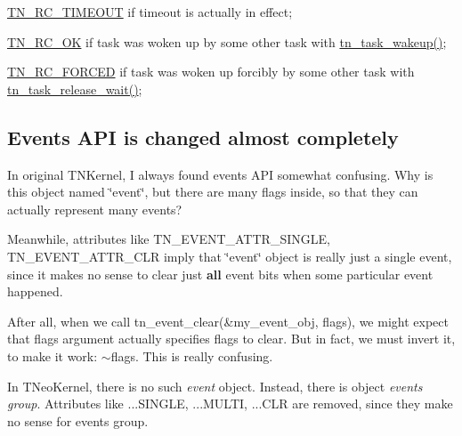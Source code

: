 \begin{DoxyItemize}
\item {\ttfamily \hyperlink{tn__common_8h_aa43bd3da1ad4c1e61224b5f23b369876a5b4d73fde6b5d1c9579c02e6aafce1fb}{T\+N\+\_\+\+R\+C\+\_\+\+T\+I\+M\+E\+O\+U\+T}} if timeout is actually in effect;
\item {\ttfamily \hyperlink{tn__common_8h_aa43bd3da1ad4c1e61224b5f23b369876afb291924237186f5765865256c75e639}{T\+N\+\_\+\+R\+C\+\_\+\+O\+K}} if task was woken up by some other task with {\ttfamily \hyperlink{tn__tasks_8h_abb88bc8b1cec6b82e7b6e2e90d0e155a}{tn\+\_\+task\+\_\+wakeup()}};
\item {\ttfamily \hyperlink{tn__common_8h_aa43bd3da1ad4c1e61224b5f23b369876ae5cbacb0fb01805c9003046c08bf4356}{T\+N\+\_\+\+R\+C\+\_\+\+F\+O\+R\+C\+E\+D}} if task was woken up forcibly by some other task with {\ttfamily \hyperlink{tn__tasks_8h_ae90ecdbd7d87d050c2c98ec775e6efc7}{tn\+\_\+task\+\_\+release\+\_\+wait()}};
\end{DoxyItemize}\hypertarget{tnkernel_diff_tnkernel_diff_event}{}\subsection{Events A\+P\+I is changed almost completely}\label{tnkernel_diff_tnkernel_diff_event}
In original T\+N\+Kernel, I always found events A\+P\+I somewhat confusing. Why is this object named \char`\"{}event\char`\"{}, but there are many flags inside, so that they can actually represent many events?

Meanwhile, attributes like {\ttfamily T\+N\+\_\+\+E\+V\+E\+N\+T\+\_\+\+A\+T\+T\+R\+\_\+\+S\+I\+N\+G\+L\+E}, {\ttfamily T\+N\+\_\+\+E\+V\+E\+N\+T\+\_\+\+A\+T\+T\+R\+\_\+\+C\+L\+R} imply that \char`\"{}event\char`\"{} object is really just a single event, since it makes no sense to clear just {\bfseries all} event bits when some particular event happened.

After all, when we call {\ttfamily tn\+\_\+event\+\_\+clear(\&my\+\_\+event\+\_\+obj, flags)}, we might expect that {\ttfamily flags} argument actually specifies flags to clear. But in fact, we must invert it, to make it work\+: {\ttfamily $\sim$flags}. This is really confusing.

In T\+Neo\+Kernel, there is no such {\itshape event} object. Instead, there is object {\itshape events group}. Attributes like {\ttfamily ...S\+I\+N\+G\+L\+E}, {\ttfamily ...M\+U\+L\+T\+I}, {\ttfamily ...C\+L\+R} are removed, since they make no sense for events group.

